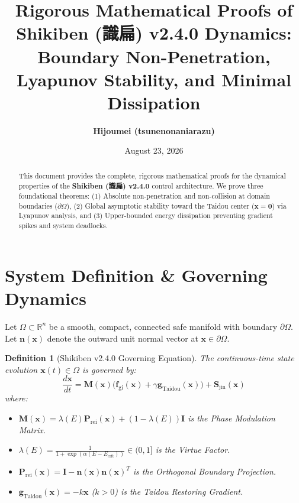 \documentclass[11pt,a4paper]{article}
\title{\textbf{Rigorous Mathematical Proofs of Shikiben (識扁) v2.4.0 Dynamics:}\\
\large Boundary Non-Penetration, Lyapunov Stability, and Minimal Dissipation}
\author{\textbf{Hijoumei (tsunenonaniarazu)}}
\date{August 23, 2026}
\newtheorem{definition}{Definition}
\begin{document}
\maketitle

\begin{abstract}
This document provides the complete, rigorous mathematical proofs for the dynamical properties of the \textbf{Shikiben (識扁) v2.4.0} control architecture. We prove three foundational theorems: (1) Absolute non-penetration and non-collision at domain boundaries ($\partial\Omega$), (2) Global asymptotic stability toward the Taidou center ($\mathbf{x} = \mathbf{0}$) via Lyapunov analysis, and (3) Upper-bounded energy dissipation preventing gradient spikes and system deadlocks.
\end{abstract}

\hr

\section{System Definition \& Governing Dynamics}

Let $\Omega \subset \mathbb{R}^n$ be a smooth, compact, connected safe manifold with boundary $\partial\Omega$. Let $\mathbf{n}(\mathbf{x})$ denote the outward unit normal vector at $\mathbf{x} \in \partial\Omega$.

\begin{definition}[Shikiben v2.4.0 Governing Equation]
The continuous-time state evolution $\mathbf{x}(t) \in \Omega$ is governed by:
\begin{equation}
\frac{d\mathbf{x}}{dt} = \mathbf{M}(\mathbf{x}) \Big( \mathbf{f}_{\text{gi}}(\mathbf{x}) + \gamma \mathbf{g}_{\text{Taidou}}(\mathbf{x}) \Big) + \mathbf{S}_{\text{jin}}(\mathbf{x})
\end{equation}
where:
\begin{itemize}
    \item $\mathbf{M}(\mathbf{x}) = \lambda(E)\mathbf{P}_{\text{rei}}(\mathbf{x}) + (1 - \lambda(E))\mathbf{I}$ is the Phase Modulation Matrix.
    \item $\lambda(E) = \frac{1}{1 + \exp(\alpha(E - E_{\text{crit}}))} \in (0, 1]$ is the Virtue Factor.
    \item $\mathbf{P}_{\text{rei}}(\mathbf{x}) = \mathbf{I} - \mathbf{n}(\mathbf{x})\mathbf{n}(\mathbf{x})^T$ is the Orthogonal Boundary Projection.
    \item $\mathbf{g}_{\text{Taidou}}(\mathbf{x}) = -k\mathbf{x}$ ($k > 0$) is the Taidou Restoring Gradient.
\end{itemize}
\end{definition}
\end{document}
